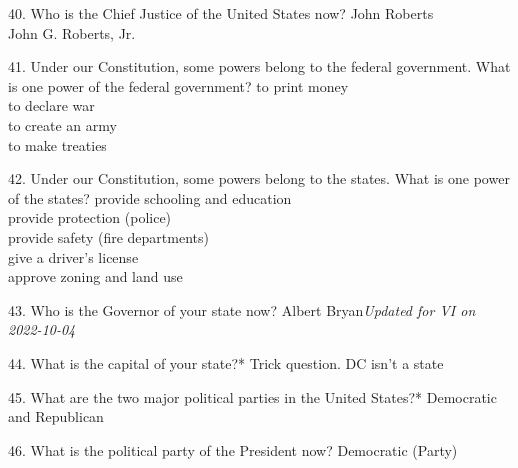 \documentclass[avery5371,frame]{flashcards}
\begin{document}
        \begin{flashcard}{40. Who is the Chief Justice of the United States now?}
        {John Roberts\\John G. Roberts, Jr.}
        \end{flashcard}
        \begin{flashcard}{41. Under our Constitution, some powers belong to the federal government. What is one power of the federal government?}
        {to print money\\to declare war\\to create an army\\to make treaties}
        \end{flashcard}
        \begin{flashcard}{42. Under our Constitution, some powers belong to the states. What is one power of the states?}
        {provide schooling and education\\provide protection (police)\\provide safety (fire departments)\\give a driver’s license\\approve zoning and land use}
        \end{flashcard}
        \begin{flashcard}{43. Who is the Governor of your state now?}
        {Albert Bryan{\footnotesize{\textsl{Updated for VI on 2022-10-04}}}}
        \end{flashcard}
        \begin{flashcard}{44. What is the capital of your state?*}
        {Trick question. DC isn't a state}
        \end{flashcard}
        \begin{flashcard}{45. What are the two major political parties in the United States?*}
        {Democratic and Republican}
        \end{flashcard}
        \begin{flashcard}{46. What is the political party of the President now?}
        {Democratic (Party)}
        \end{flashcard}
\end{document}
